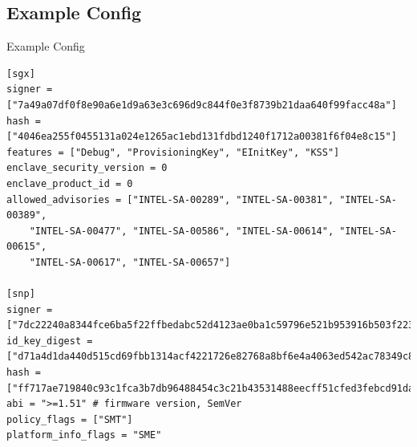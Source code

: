 \documentclass[graphics]{beamer}
\begin{document}
\subsection{Example Config}
\begin{frame}[fragile]{Example Config}
    \begin{verbatim}
[sgx]
signer = ["7a49a07df0f8e90a6e1d9a63e3c696d9c844f0e3f8739b21daa640f99facc48a"]
hash = ["4046ea255f0455131a024e1265ac1ebd131fdbd1240f1712a00381f6f04e8c15"]
features = ["Debug", "ProvisioningKey", "EInitKey", "KSS"]
enclave_security_version = 0
enclave_product_id = 0
allowed_advisories = ["INTEL-SA-00289", "INTEL-SA-00381", "INTEL-SA-00389",
    "INTEL-SA-00477", "INTEL-SA-00586", "INTEL-SA-00614", "INTEL-SA-00615",
    "INTEL-SA-00617", "INTEL-SA-00657"]

[snp]
signer = ["7dc22240a8344fce6ba5f22ffbedabc52d4123ae0ba1c59796e521b953916b503f223b15c4429e7d8c5489ad71f1e193"]
id_key_digest = ["d71a4d1da440d515cd69fbb1314acf4221726e82768a8bf6e4a4063ed542ac78349c8145b4666a4242a91a374387b473"]
hash = ["ff717ae719840c93c1fca3b7db96488454c3c21b43531488eecff51cfed3febcd91da8be87a4cbcbc52a3bae770987c3"]
abi = ">=1.51" # firmware version, SemVer
policy_flags = ["SMT"]
platform_info_flags = "SME"
    \end{verbatim}
\end{frame}
\end{document}
